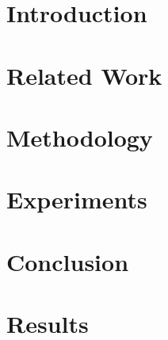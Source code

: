 \documentclass[letterpaper, 10 pt, conference, onecolumn]{IEEEtran}
\begin{document}

\section{Introduction}

%
\section{Related Work}

%
\section{Methodology}

%
\section{Experiments}

%
\section{Conclusion}

%
\section{Results}



% 
% 
\end{document}
